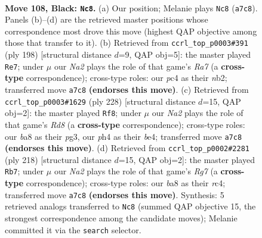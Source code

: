 \documentclass[11pt]{article}
\begin{document}
\clearpage

\begin{figure}[p]\centering
\begin{subfigure}{0.46\textwidth}\centering
\resizebox{\linewidth}{!}{%
\newchessgame
\chessboard[
  setfen={B7/n5k1/8/6PK/2P4P/8/8/8 b - - 0 108},
  showmover=false,
  pgfstyle=straightmove, color=movearrow, markmove={a7-c8}
]}
\caption{}
\end{subfigure}\hfill
\begin{subfigure}{0.46\textwidth}\centering
\resizebox{\linewidth}{!}{%
\newchessgame
\chessboard[
  setfen={8/R7/8/8/4p3/4kp2/1n6/4K3 w - - 36 100},
  showmover=false,
  pgfstyle=straightmove, color=movearrow, markmove={a7-e7}
]}
\caption{}
\end{subfigure}
\\[4pt]
\begin{subfigure}{0.46\textwidth}\centering
\resizebox{\linewidth}{!}{%
\newchessgame
\chessboard[
  setfen={3R4/8/8/8/4b3/4kpp1/8/5K2 w - - 80 115},
  showmover=false,
  pgfstyle=straightmove, color=movearrow, markmove={d8-f8}
]}
\caption{}
\end{subfigure}\hfill
\begin{subfigure}{0.46\textwidth}\centering
\resizebox{\linewidth}{!}{%
\newchessgame
\chessboard[
  setfen={8/6R1/8/5p2/2r2k2/5p2/8/5K2 w - - 16 110},
  showmover=false,
  pgfstyle=straightmove, color=movearrow, markmove={g7-b7}
]}
\caption{}
\end{subfigure}
\caption{\textbf{Move 108, Black: \texttt{Nc8}.} (a) Our position; Melanie plays \texttt{Nc8} (\texttt{a7c8}). Panels (b)--(d) are the retrieved master positions whose correspondence most drove this move (highest QAP objective among those that transfer to it). (b) Retrieved from \texttt{ccrl\_top\_p0003\#391} (ply 198) [structural distance $d$=9, QAP obj=5]: the master played \texttt{Re7}; under $\mu$ our \emph{Na2} plays the role of that game's \emph{Ra7} (a \textbf{cross-type} correspondence); cross-type roles: our \emph{p}c4 as their \emph{n}b2; transferred move \texttt{a7c8} \textbf{(endorses this move)}. (c) Retrieved from \texttt{ccrl\_top\_p0003\#1629} (ply 228) [structural distance $d$=15, QAP obj=2]: the master played \texttt{Rf8}; under $\mu$ our \emph{Na2} plays the role of that game's \emph{Rd8} (a \textbf{cross-type} correspondence); cross-type roles: our \emph{b}a8 as their \emph{p}g3, our \emph{p}h4 as their \emph{b}e4; transferred move \texttt{a7c8} \textbf{(endorses this move)}. (d) Retrieved from \texttt{ccrl\_top\_p0002\#2281} (ply 218) [structural distance $d$=15, QAP obj=2]: the master played \texttt{Rb7}; under $\mu$ our \emph{Na2} plays the role of that game's \emph{Rg7} (a \textbf{cross-type} correspondence); cross-type roles: our \emph{b}a8 as their \emph{r}c4; transferred move \texttt{a7c8} \textbf{(endorses this move)}. Synthesis: 5 retrieved analogs transferred to \texttt{Nc8} (summed QAP objective 15, the strongest correspondence among the candidate moves); Melanie committed it via the \texttt{search} selector.}
\label{fig:thought-m215}
\end{figure}
\end{document}
